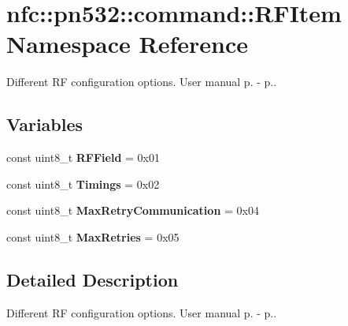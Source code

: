 \hypertarget{namespacenfc_1_1pn532_1_1command_1_1RFItem}{}\section{nfc\+:\+:pn532\+:\+:command\+:\+:R\+F\+Item Namespace Reference}
\label{namespacenfc_1_1pn532_1_1command_1_1RFItem}


Different RF configuration options. User manual p. -\/ p..  


\subsection*{Variables}
\begin{DoxyCompactItemize}
\item 
\mbox{\label{namespacenfc_1_1pn532_1_1command_1_1RFItem_a9c80da3e62429d0e8953a0c8a953e120}} 
const uint8\+\_\+t {\bfseries R\+F\+Field} = 0x01
\item 
\mbox{\label{namespacenfc_1_1pn532_1_1command_1_1RFItem_a299b7eab472465cff453e9ac26731793}} 
const uint8\+\_\+t {\bfseries Timings} = 0x02
\item 
\mbox{\label{namespacenfc_1_1pn532_1_1command_1_1RFItem_a642bb15ff8b1ad9b522752d543343158}} 
const uint8\+\_\+t {\bfseries Max\+Retry\+Communication} = 0x04
\item 
\mbox{\label{namespacenfc_1_1pn532_1_1command_1_1RFItem_ac1974af8b80f425dcbce29bed9045300}} 
const uint8\+\_\+t {\bfseries Max\+Retries} = 0x05
\end{DoxyCompactItemize}


\subsection{Detailed Description}
Different RF configuration options. User manual p. -\/ p.. 